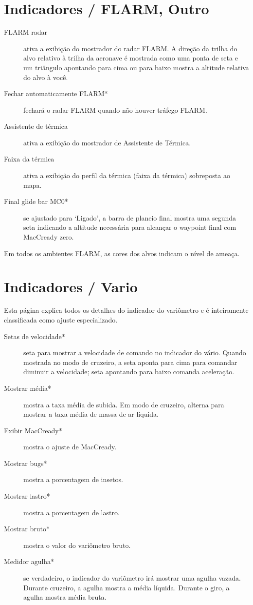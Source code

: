 \section{Indicadores / FLARM, Outro} \label{sec:flarmandother-gauge}

\begin{description}
\item[FLARM radar]  \label{conf:flarmdisplay} ativa a exibição do mostrador do radar FLARM.  A direção da trilha do alvo relativo à trilha da aeronave é mostrada como uma ponta de seta e um triângulo apontando para cima ou para baixo mostra a altitude relativa do alvo à você.
\\
\item[Fechar automaticamente FLARM*]  fechará o radar FLARM quando não houver tráfego FLARM.
\item[Assistente de térmica] \label{conf:thermalassistant} ativa a exibição do mostrador de Assistente de Térmica.
\item[Faixa da térmica] \label{conf:thermalband} ativa a exibição do perfil da térmica (faixa da térmica) sobreposta ao mapa.
\item[Final glide bar MC0*]  se ajustado para ‘Ligado’, a barra de planeio final mostra uma segunda seta indicando a altitude necessária para alcançar o waypoint final com MacCready zero.
\end{description}
Em todos os ambientes FLARM, as cores dos alvos indicam o nível de ameaça.

\section{Indicadores / Vario}\label{sec:vario-gauge}

Esta página explica todos os detalhes do indicador do variômetro e é inteiramente classificada como ajuste especializado.

\begin{description}
\item[Setas de velocidade*]  \label{conf:variogauge} seta para mostrar a velocidade de comando no indicador do vário.  Quando mostrada no modo de cruzeiro, a seta aponta para cima para comandar diminuir a velocidade; seta apontando para baixo comanda aceleração.
\item[Mostrar média*]  mostra a taxa média de subida.  Em modo de cruzeiro, alterna para mostrar a taxa média de massa de ar líquida.
\item[Exibir MacCready*]  mostra o ajuste de MacCready.
\item[Mostrar  bugs*]  mostra a porcentagem de insetos.
\item[Mostrar lastro*] mostra a porcentagem de lastro.
\item[Mostrar bruto*]  mostra o valor do variômetro bruto.
\item[Medidor agulha*] se verdadeiro, o indicador do variômetro irá mostrar uma agulha vazada.  
Durante cruzeiro, a agulha mostra a média líquida.
Durante o giro, a agulha mostra média bruta.

\end{description}

